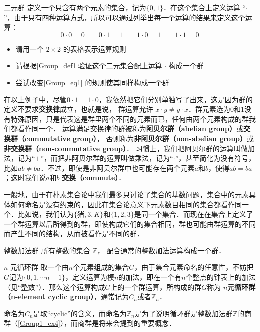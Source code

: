 \begin{exercise}{二元群}\label{Group_exe1}
定义一个只含有两个元素的集合，记为$\{0, 1\}$．在这个集合上定义运算 “$\cdot$”，由于只有四种运算方式，所以可以通过列举出每一个运算的结果来定义这个运算：
\begin{equation}\label{Group_eq1}
0\cdot0=0 \qquad 0\cdot1=1 \qquad 1\cdot0=1 \qquad 1\cdot1=0
\end{equation}
\begin{itemize}
\item 请用一个 $2\times2$ 的表格表示运算规则
\item 请根据\autoref{Group_def1}验证这个二元集合配上运算 $\cdot$ 构成一个群
\item 尝试改变\autoref{Group_eq1} 的规则使其同样构成一个群
\end{itemize}
\end{exercise}

在以上例子中，尽管$0\cdot1=1\cdot0$，我依然把它们分别单独写了出来，这是因为群的定义不要求\textbf{交换律}成立，也就是说， 群运算允许 $x\cdot y\neq y\cdot x$．群元素选为$0$和$1$没有特殊原因，只是代表这是群里两个不同的元素而已，任何由两个元素构成的群我们都看作同一个． 运算满足交换律的群被称为\textbf{阿贝尔群（abelian group）}或\textbf{交换群（commutative group）}， 否则称为\textbf{非阿贝尔群（non-abelian group）}或\textbf{非交换群（non-commutative group）}． 习惯上，我们把阿贝尔群的运算叫做加法，记为“$+$”，而把非阿贝尔群的运算叫做乘法，记为“$\cdot$”，甚至简化为没有符号，比如$ab\not= ba$．不过，即使是非阿贝尔群中也可能存在两个元素$a$和$b$，使得$ab=ba$；这时我们说$a$和$b$ \textbf{交换（commute）}．

一般地，由于在朴素集合论中我们最多只讨论了集合的基数问题，集合中的元素具体如何命名是没有约束的，因此在集合论意义下元素数目相同的集合都看作同一个．比如说，我们认为$\{\text{猪},3, K\}$和$\{1,2,3\}$是同一个集合．而现在在集合上定义了一个群运算以后所得到的群，即使构成它们的集合相同，群也可能由群运算的不同而产生不同的结构，从而被看作是不同的群．

\begin{example}{整数加法群}\label{Group_ex1}
所有整数的集合 $\mathbb Z$， 配合通常的整数加法运算构成一个群．
\end{example}

\begin{example}{$n$ 元循环群}\label{Group_ex2}
取一个由$n$个元素组成的集合$G$，由于集合元素命名的任意性，不妨把$G$记为$\{0, 1, \cdots n-1\}$，定义运算为模$n$的加法，即在一个有$n$个整点的钟表上的加法（见“整数”）．那么这个运算构成$G$上的一个群运算，所构成的群$G$称为 \textbf{$n$元循环群（n-element cyclic group）}，通常记为$C_n$或者$\mathbb{Z}_n$．

命名为$C_n$是取“cyclic”的含义，而命名为$\mathbb{Z}_n$是为了说明循环群是整数加法群$\mathbb{Z}$的商群（\autoref{Group1_ex4}），而商群是将来会提到的重要概念．
\end{example}

